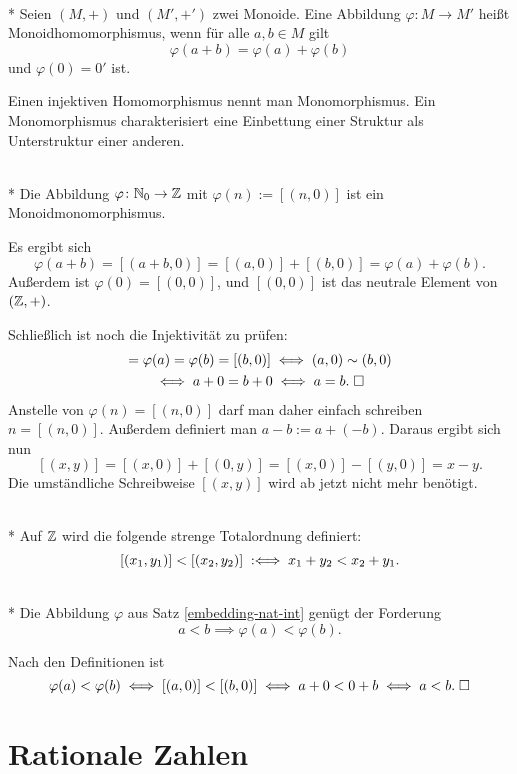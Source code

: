 \begin{Definition}[Monoidhomomorphismus]\mbox{}\\*
Seien $(M,+)$ und $(M',+')$ zwei Monoide. Eine Abbildung
$\varphi\colon M\to M'$ heißt Monoidhomomorphismus, wenn
für alle $a,b\in M$ gilt
\[\varphi(a+b) = \varphi(a)+\varphi(b)\]
und $\varphi(0)=0'$ ist.
\end{Definition}
Einen injektiven Homomorphismus nennt man Monomorphismus. Ein
Monomorphismus charakterisiert eine Einbettung einer Struktur als
Unterstruktur einer anderen.

\begin{Satz}%
\label{embedding-nat-int}\mbox{}\\*
Die Abbildung $\varphi\colon\mathbb N_0\to\mathbb Z$ mit $\varphi(n):=[(n,0)]$
ist ein Monoidmonomorphismus.
\end{Satz}
 Es ergibt sich
\[\varphi(a+b) = [(a+b,0)] = [(a,0)]+[(b,0)] = \varphi(a)+\varphi(b).\]
Außerdem ist $\varphi(0)=[(0,0)]$, und $[(0,0)]$
ist das neutrale Element von $(\mathbb Z,+)$.

Schließlich ist noch die Injektivität zu prüfen:
\begin{gather*}
[(a,0)] = \varphi(a) = \varphi(b)  = [(b,0)]\iff (a,0)\sim (b,0)\\
\iff a+0 = b+0 \iff a=b.\;\qedsymbol
\end{gather*}
Anstelle von $\varphi(n)=[(n,0)]$ darf man daher einfach schreiben
$n=[(n,0)]$. Außerdem definiert man $a-b:=a+(-b)$. Daraus
ergibt sich nun
\[[(x,y)] = [(x,0)]+[(0,y)] = [(x,0)] - [(y,0)] = x-y.\]
Die umständliche Schreibweise $[(x,y)]$ wird ab jetzt nicht
mehr benötigt.

\begin{Definition}\mbox{}\\*
Auf $\mathbb Z$ wird die folgende strenge Totalordnung definiert:
\[[(x_1,y_1)] < [(x_2,y_2)] \;:\Longleftrightarrow\; x_1+y_2<x_2+y_1.\]
\end{Definition}

\begin{Satz}\mbox{}\\*
Die Abbildung $\varphi$ aus Satz \ref{embedding-nat-int}
genügt der Forderung
\[a<b \implies \varphi(a)<\varphi(b).\]
\end{Satz}
 Nach den Definitionen ist
\[\varphi(a)<\varphi(b)\iff [(a,0)]<[(b,0)]\iff a+0<0+b\iff a<b.\;\Box\]


\newpage
\section{Rationale Zahlen}

